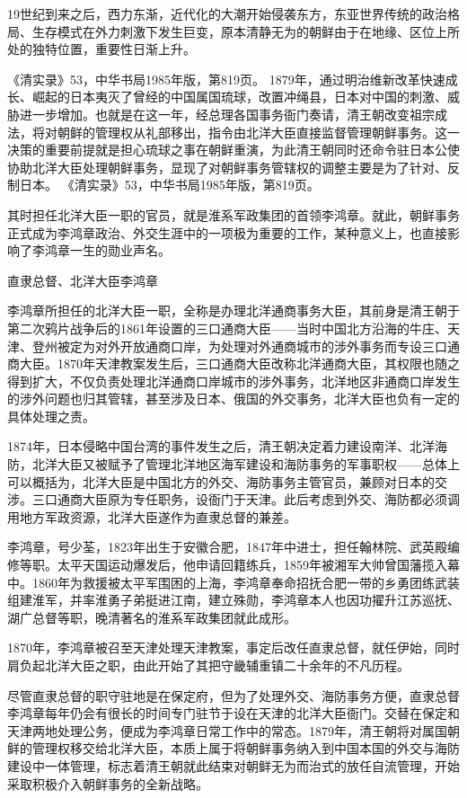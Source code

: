 \documentclass[12pt,UTF8]{ctexbook}
\begin{document}
19世纪到来之后，西力东渐，近代化的大潮开始侵袭东方，东亚世界传统的政治格局、生存模式在外力刺激下发生巨变，原本清静无为的朝鲜由于在地缘、区位上所处的独特位置，重要性日渐上升。

《清实录》53，中华书局1985年版，第819页。
1879年，通过明治维新改革快速成长、崛起的日本夷灭了曾经的中国属国琉球，改置冲绳县，日本对中国的刺激、威胁进一步增加。也就是在这一年，经总理各国事务衙门奏请，清王朝改变祖宗成法，将对朝鲜的管理权从礼部移出，指令由北洋大臣直接监督管理朝鲜事务。这一决策的重要前提就是担心琉球之事在朝鲜重演，为此清王朝同时还命令驻日本公使协助北洋大臣处理朝鲜事务，显现了对朝鲜事务管辖权的调整主要是为了针对、反制日本。 《清实录》53，中华书局1985年版，第819页。

其时担任北洋大臣一职的官员，就是淮系军政集团的首领李鸿章。就此，朝鲜事务正式成为李鸿章政治、外交生涯中的一项极为重要的工作，某种意义上，也直接影响了李鸿章一生的勋业声名。


直隶总督、北洋大臣李鸿章

李鸿章所担任的北洋大臣一职，全称是办理北洋通商事务大臣，其前身是清王朝于第二次鸦片战争后的1861年设置的三口通商大臣——当时中国北方沿海的牛庄、天津、登州被定为对外开放通商口岸，为处理对外通商城市的涉外事务而专设三口通商大臣。1870年天津教案发生后，三口通商大臣改称北洋通商大臣，其权限也随之得到扩大，不仅负责处理北洋通商口岸城市的涉外事务，北洋地区非通商口岸发生的涉外问题也归其管辖，甚至涉及日本、俄国的外交事务，北洋大臣也负有一定的具体处理之责。

1874年，日本侵略中国台湾的事件发生之后，清王朝决定着力建设南洋、北洋海防，北洋大臣又被赋予了管理北洋地区海军建设和海防事务的军事职权——总体上可以概括为，北洋大臣是中国北方的外交、海防事务主管官员，兼顾对日本的交涉。三口通商大臣原为专任职务，设衙门于天津。此后考虑到外交、海防都必须调用地方军政资源，北洋大臣遂作为直隶总督的兼差。

李鸿章，号少荃，1823年出生于安徽合肥，1847年中进士，担任翰林院、武英殿编修等职。太平天国运动爆发后，他申请回籍练兵，1859年被湘军大帅曾国藩揽入幕中。1860年为救援被太平军围困的上海，李鸿章奉命招抚合肥一带的乡勇团练武装组建淮军，并率淮勇子弟挺进江南，建立殊勋，李鸿章本人也因功擢升江苏巡抚、湖广总督等职，晚清著名的淮系军政集团就此成形。

1870年，李鸿章被召至天津处理天津教案，事定后改任直隶总督，就任伊始，同时肩负起北洋大臣之职，由此开始了其把守畿辅重镇二十余年的不凡历程。

尽管直隶总督的职守驻地是在保定府，但为了处理外交、海防事务方便，直隶总督李鸿章每年仍会有很长的时间专门驻节于设在天津的北洋大臣衙门。交替在保定和天津两地处理公务，便成为李鸿章日常工作中的常态。1879年，清王朝将对属国朝鲜的管理权移交给北洋大臣，本质上属于将朝鲜事务纳入到中国本国的外交与海防建设中一体管理，标志着清王朝就此结束对朝鲜无为而治式的放任自流管理，开始采取积极介入朝鲜事务的全新战略。
\end{document}
